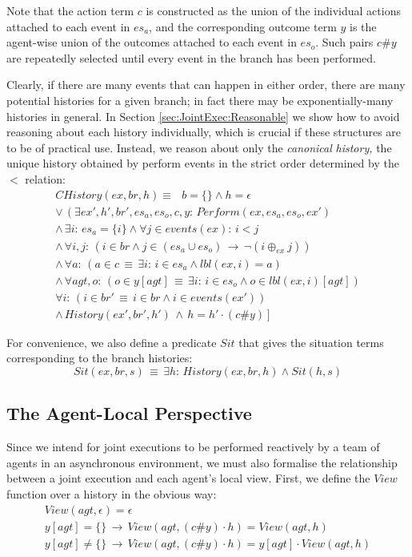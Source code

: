 Note that the action term $c$ is constructed as the union of the
individual actions attached to each event in $es_{a}$, and the corresponding
outcome term $y$ is the agent-wise union of the outcomes attached
to each event in $es_{o}$. Such pairs $c\#y$ are repeatedly selected
until every event in the branch has been performed.

Clearly, if there are many events that can happen in either order,
there are many potential histories for a given branch; in fact there
may be exponentially-many histories in general. In Section \ref{sec:JointExec:Reasonable}
we show how to avoid reasoning about each history individually, which
is crucial if these structures are to be of practical use. Instead,
we reason about only the \emph{canonical} \emph{history,} the unique
history obtained by perform events in the strict order determined
by the $<$ relation:\begin{gather*}
CHistory(ex,br,h)\equiv\,\,\,\, b=\{\}\wedge h=\epsilon\\
\vee\,\left(\exists ex',h',br',es_{a},es_{o},c,y:\, Perform(ex,es_{a},es_{o},ex')\right.\\
\wedge\,\exists i:\, es_{a}=\{i\}\wedge\forall j\in events(ex):\, i<j\\
\wedge\,\forall i,j:\,\left(i\in br\wedge j\in(es_{a}\cup es_{o})\,\rightarrow\,\neg(i\oplus_{ex}j)\right)\\
\wedge\,\forall a:\,\left(a\in c\,\equiv\,\exists i:\, i\in es_{a}\wedge lbl(ex,i)=a\right)\\
\wedge\,\forall agt,o:\,\left(o\in y[agt]\,\equiv\,\exists i:\, i\in es_{o}\wedge o\in lbl(ex,i)[agt]\right)\\
\forall i:\,\left(i\in br'\,\equiv\, i\in br\wedge i\in events(ex')\right)\\
\left.\wedge\, History(ex',br',h')\,\wedge\, h=h'\cdot(c\#y)\right]\end{gather*}


For convenience, we also define a predicate $Sit$ that gives the
situation terms corresponding to the branch histories:\[
Sit(ex,br,s)\,\equiv\,\exists h:\, History(ex,br,h)\wedge Sit(h,s)\]



\subsection{The Agent-Local Perspective}

Since we intend for joint executions to be performed reactively by
a team of agents in an asynchronous environment, we must also formalise
the relationship between a joint execution and each agent's local
view. First, we define the $View$ function over a history in the
obvious way:\begin{gather*}
View(agt,\epsilon)=\epsilon\\
y[agt]=\{\}\,\rightarrow\, View(agt,(c\#y)\cdot h)=View(agt,h)\\
y[agt]\neq\{\}\,\rightarrow\, View(agt,(c\#y)\cdot h)=y[agt]\cdot View(agt,h)\end{gather*}


